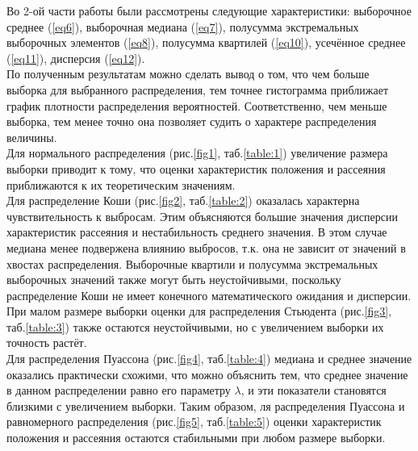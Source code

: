 Во 2-ой части работы были рассмотрены следующие характеристики: выборочное среднее (\ref{eq6}), выборочная медиана (\ref{eq7}), полусумма экстремальных выборочных элементов (\ref{eq8}), полусумма квартилей (\ref{eq10}), усечённое среднее (\ref{eq11}), дисперсия (\ref{eq12}).\\
По полученным результатам можно сделать вывод о том, что чем больше выборка для выбранного распределения, тем точнее гистограмма приближает график плотности распределения вероятностей. Соответственно, чем меньше выборка, тем менее точно она позволяет судить о характере распределения величины.\\
Для нормального распределения (рис.\ref{fig1}, таб.\ref{table:1}) увеличение размера выборки приводит к тому, что оценки характеристик положения и рассеяния приближаются к их теоретическим значениям.\\
Для распределение Коши (рис.\ref{fig2}, таб.\ref{table:2}) оказалась характерна чувствительность к выбросам. Этим объясняются большие значения дисперсии характеристик рассеяния и нестабильность среднего значения. В этом случае медиана менее подвержена влиянию выбросов, т.к. она не зависит от значений в хвостах распределения. Выборочные квартили и полусумма экстремальных выборочных значений также могут быть неустойчивыми, поскольку распределение Коши не имеет конечного математического ожидания и дисперсии.\\
При малом размере выборки оценки для распределения Стьюдента (рис.\ref{fig3}, таб.\ref{table:3}) также остаются неустойчивыми, но с увеличением выборки их точность растёт.\\
Для распределения Пуассона (рис.\ref{fig4}, таб.\ref{table:4}) медиана и среднее значение оказались практически схожими, что можно объяснить тем, что среднее значение в данном распределении равно его параметру $\lambda$, и эти показатели становятся близкими с увеличением выборки. Таким образом, ля распределения Пуассона и равномерного распределения (рис.\ref{fig5}, таб.\ref{table:5}) оценки характеристик положения и рассеяния остаются стабильными при любом размере выборки.\\

